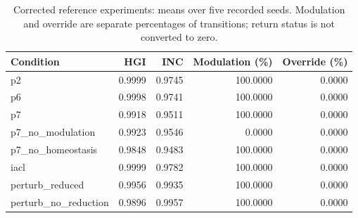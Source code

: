 \begin{table}[htbp]
\centering\small
\caption{Corrected reference experiments: means over five recorded seeds. Modulation and override are separate percentages of transitions; return status is not converted to zero.}
\label{tab:p0-corrected}
\begin{tabular}{lrrrr}
\toprule
Condition & HGI & INC & Modulation (\%) & Override (\%) \\
\midrule
p2 & 0.9999 & 0.9745 & 100.0000 & 0.0000 \\
p6 & 0.9998 & 0.9741 & 100.0000 & 0.0000 \\
p7 & 0.9918 & 0.9511 & 100.0000 & 0.0000 \\
p7\_no\_modulation & 0.9923 & 0.9546 & 0.0000 & 0.0000 \\
p7\_no\_homeostasis & 0.9848 & 0.9483 & 100.0000 & 0.0000 \\
iacl & 0.9999 & 0.9782 & 100.0000 & 0.0000 \\
perturb\_reduced & 0.9956 & 0.9935 & 100.0000 & 0.0000 \\
perturb\_no\_reduction & 0.9896 & 0.9957 & 100.0000 & 0.0000 \\
\bottomrule
\end{tabular}
\end{table}
